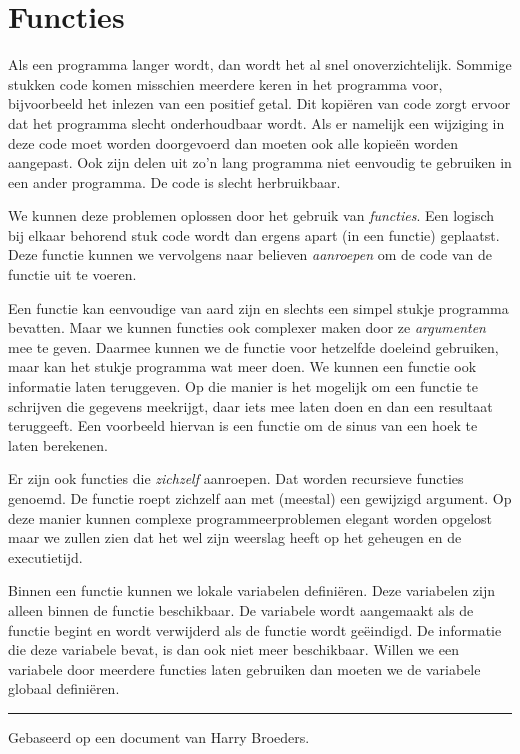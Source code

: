 \chapter{Functies}
\label{cha:functies}
\thispagestyle{empty}

Als een programma langer wordt, dan wordt het al snel onoverzichtelijk. Sommige stukken code komen misschien meerdere keren in het programma voor, bijvoorbeeld het inlezen van een positief getal. Dit kopiëren van code zorgt ervoor dat het programma slecht onderhoudbaar wordt. Als er namelijk een wijziging in deze code moet worden doorgevoerd dan moeten ook alle kopieën worden aangepast. Ook zijn delen uit zo'n lang programma niet eenvoudig te gebruiken in een ander programma. De code is slecht herbruikbaar.

We kunnen deze problemen oplossen door het gebruik van \textsl{functies}. Een logisch bij elkaar behorend stuk code wordt dan ergens apart (in een functie) geplaatst. Deze functie kunnen we vervolgens naar believen \textsl{aanroepen} om de code van de functie uit te voeren.

Een functie kan eenvoudige van aard zijn en slechts een simpel stukje programma bevatten. Maar we kunnen functies ook complexer maken door ze \textsl{argumenten} mee te geven. Daarmee kunnen we de functie voor hetzelfde doeleind gebruiken, maar kan het stukje programma wat meer doen. We kunnen een functie ook informatie laten teruggeven. Op die manier is het mogelijk om een functie te schrijven die gegevens meekrijgt, daar iets mee laten doen en dan een resultaat teruggeeft. Een voorbeeld hiervan is een functie om de sinus van een hoek te laten berekenen.

Er zijn ook functies die \textsl{zichzelf} aanroepen. Dat worden recursieve functies genoemd. De functie roept zichzelf aan met (meestal) een gewijzigd argument. Op deze manier kunnen complexe programmeerproblemen elegant worden opgelost maar we zullen zien dat het wel zijn weerslag heeft op het geheugen en de executietijd.

Binnen een functie kunnen we lokale variabelen definiëren. Deze variabelen zijn alleen binnen de functie beschikbaar. De variabele wordt aangemaakt als de functie begint en wordt verwijderd als de functie wordt geëindigd. De informatie die deze variabele bevat, is dan ook niet meer beschikbaar. Willen we een variabele door meerdere functies laten gebruiken dan moeten we de variabele globaal definiëren.

\vfill
\hrule width 2in \relax
{\footnotesize Gebaseerd op een document van Harry Broeders.}


